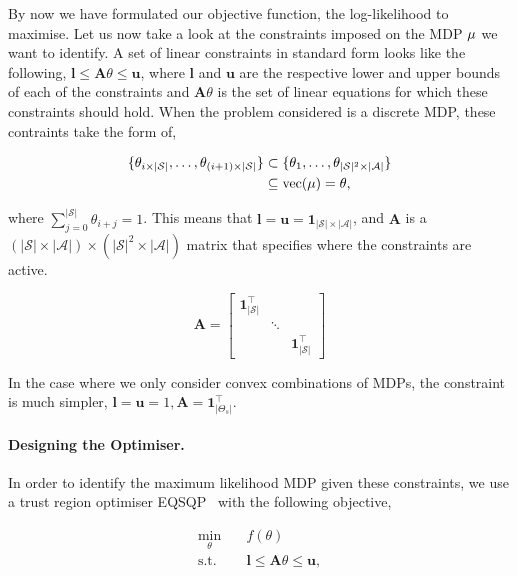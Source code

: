 By now we have formulated our objective function, the log-likelihood to maximise. Let us now take a look at the constraints imposed on the MDP $\mu$ we want to identify. A set of linear constraints in standard form looks like the following, $\bm{l} \leq \mathbf{A}\theta \leq \bm{u}$, where $\bm{l}$ and $\bm{u}$ are the respective lower and upper bounds of each of the constraints and $\mathbf{A}\theta$ is the set of linear equations for which these constraints should hold. When the problem considered is a discrete MDP, these contraints take the form of,

\begin{align}
\{\theta_{i\times|\mathcal{S}|}, \ldots, \theta_{(i+1)\times|\mathcal{S}|}\} &\subset \{\theta_1, \ldots, \theta_{|\mathcal{S}|^2\times|\mathcal{A}|}\}\\ &\subseteq \textrm{vec}(\mu) = \theta,
\end{align}

where $\sum_{j=0}^{|\mathcal{S}|} \theta_{i+j} = 1$. This means that $\bm{l}=\bm{u}=\bm{1}_{|\mathcal{S}|\times|\mathcal{A}|}$, and $\mathbf{A}$ is a $(|\mathcal{S}|\times|\mathcal{A}|) \times (|\mathcal{S}|^2 \times |\mathcal{A}|)$ matrix that specifies where the constraints are active.

\begin{equation}
    \mathbf{A} =   \begin{bmatrix}
                \bm{1}^\top_{|\mathcal{S}|} & & \\
                & \ddots & \\
                & & \bm{1}^\top_{|\mathcal{S}|}
\end{bmatrix}
\end{equation}

In the case where we only consider convex combinations of MDPs, the constraint is much simpler, $\bm{l} = \bm{u} = 1, \mathbf{A} = \bm{1}^\top_{|\Theta_s|}$.

\paragraph{Designing the Optimiser.} In order to identify the maximum likelihood MDP given these constraints, we use a trust region optimiser \textsc{EQSQP}~\cite{byrd1987robust, omojokun1989trust, lalee1998implementation} with the following objective,

\begin{equation}
\begin{aligned}
\underset{\theta}{\min} \quad &f(\theta)\\
\textrm{s.t.} \quad & \bm{l} \leq \mathbf{A}\theta \leq \bm{u},\\
\end{aligned}
\end{equation}

